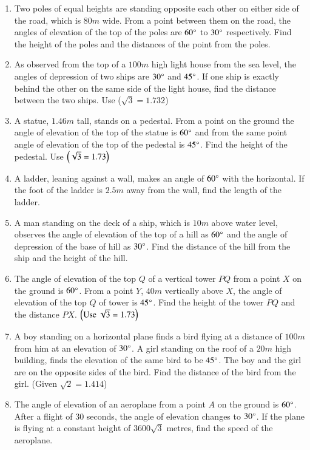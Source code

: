 \begin{enumerate}[label=\thesubsection.\arabic*.,ref=\thesubsection.\theenumi]
\hfill{}\item Two poles of equal heights are standing opposite each other on either side of the road, which is $80 m$  wide. From a point between them on the road, the angles of elevation of the top of the poles are $60\degree$ to $30\degree$ respectively. Find the height of the poles and the distances of the point from the poles.
\hfill{}
		\item As observed from the top of a $100 m$ high light house from the sea level, the angles of depression of two ships are $30\degree$ and $45\degree$. If one ship is exactly behind the other on the same side of the light house, find the distance between the two ships. {Use} ($\sqrt3 = 1.732$)
\hfill{}
\item A statue, $1.46m$ tall, stands on a pedestal. From a point on the ground the angle of elevation of the top of the statue is $60\degree{}$ and from the same point angle of elevation of the top of the pedestal is $45\degree{}$. Find the height of the pedestal. Use $\left(\sqrt{3}=1.73\right)$
\hfill{}
\item A ladder, leaning against a wall, makes an angle of $60 \degree$ with the horizontal. If the foot of the ladder is $2. 5m$ away from the wall, find the length of the ladder. 
\hfill{}\item  A man standing on the deck of a ship, which is $10m$ above water level, observes the angle of elevation of the top of a hill as $ 60\degree $ and the angle of depression of the base of hill as $ 30 \degree $. Find the distance of the hill from the ship and the height of the hill.
\hfill{}\item The angle of elevation of the top $Q$ of a vertical tower $PQ$ from a point $X$ on the ground is $ 60\degree $. From a point $Y$, $40m$ vertically above $X$, the angle of elevation of the top $Q$ of tower is $ 45 \degree $. Find the height of the tower $PQ$ and the distance $PX$. $\left(\text{Use }\sqrt{3} = 1.73\right)$
\hfill{}
\item A boy standing on a horizontal plane finds a bird flying at a distance of $100 m$ from him at an elevation of $30\degree$. A girl standing on the roof of a $20 m$ high building, finds the elevation of the same bird to be $45\degree$. The boy and the girl are on the opposite sides of the bird. Find the distance of the bird from the girl. (Given ${\sqrt 2}= 1.414$)
%
\hfill{}\item The angle of elevation of an aeroplane from a point $A$ on the ground is $60\degree$. After a flight of $30$ seconds, the angle of elevation changes to $30\degree$. If the plane is flying at a constant height of $3600\sqrt 3 $ metres, find the speed of the aeroplane.

\end{enumerate}
